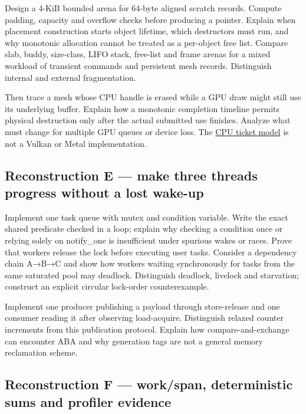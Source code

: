 Design a 4-KiB bounded arena for 64-byte aligned scratch records. Compute padding, capacity and overflow checks before producing a pointer. Explain when placement construction starts object lifetime, which destructors must run, and why monotonic allocation cannot be treated as a per-object free list. Compare slab, buddy, size-class, LIFO stack, free-list and frame arenas for a mixed workload of transient commands and persistent mesh records. Distinguish internal and external fragmentation.

Then trace a mesh whose CPU handle is erased while a GPU draw might still use its underlying buffer. Explain how a monotonic completion timeline permits physical destruction only after the actual submitted use finishes. Analyze what must change for multiple GPU queues or device loss. The \href{tools/labs/phase4_cpu_systems_lab.cpp}{CPU ticket model} is not a Vulkan or Metal implementation.

\subsection{Reconstruction E --- make three threads progress without a lost wake-up}\label{reconstruction-e-make-three-threads-progress-without-a-lost-wake-up}

Implement one task queue with mutex and condition variable. Write the exact shared predicate checked in a loop; explain why checking a condition once or relying solely on notify\_one is insufficient under spurious wakes or races. Prove that workers release the lock before executing user tasks. Consider a dependency chain A→B→C and show how workers waiting synchronously for tasks from the same saturated pool may deadlock. Distinguish deadlock, livelock and starvation; construct an explicit circular lock-order counterexample.

Implement one producer publishing a payload through store-release and one consumer reading it after observing load-acquire. Distinguish relaxed counter increments from this publication protocol. Explain how compare-and-exchange can encounter ABA and why generation tags are not a general memory reclamation scheme.

\subsection{Reconstruction F --- work/span, deterministic sums and profiler evidence}\label{reconstruction-f-workspan-deterministic-sums-and-profiler-evidence}

